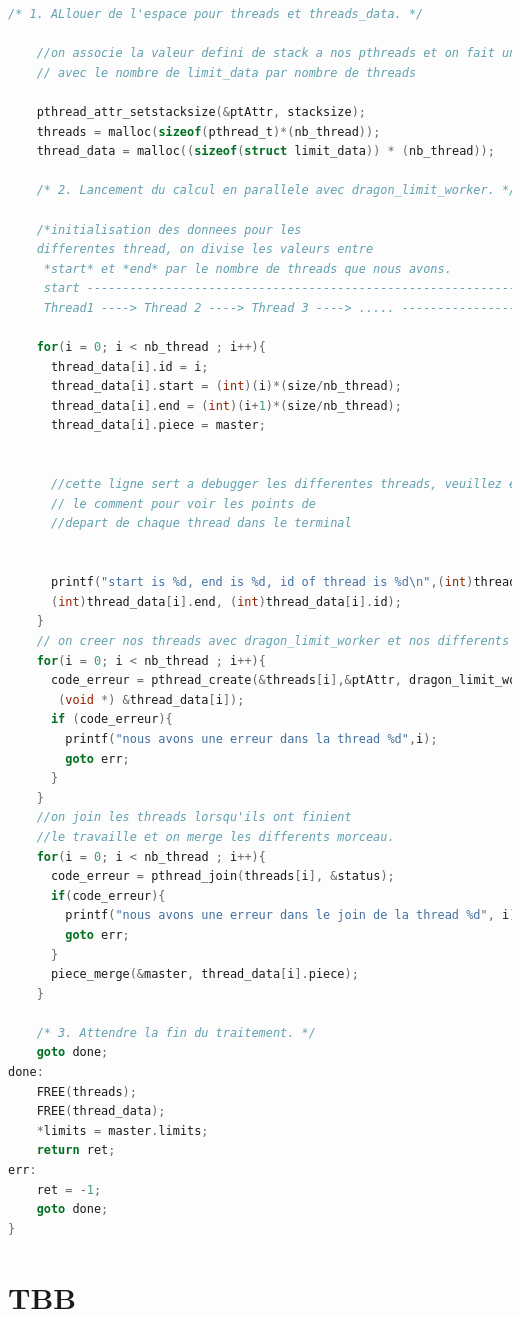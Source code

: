 \documentclass[oneside]{book}
\begin{document}
\begin{lstlisting}[language=C]
	/* 1. ALlouer de l'espace pour threads et threads_data. */
	
	//on associe la valeur defini de stack a nos pthreads et on fait un malloc
	// avec le nombre de limit_data par nombre de threads
	
	pthread_attr_setstacksize(&ptAttr, stacksize);
	threads = malloc(sizeof(pthread_t)*(nb_thread));
	thread_data = malloc((sizeof(struct limit_data)) * (nb_thread));
	
	/* 2. Lancement du calcul en parallele avec dragon_limit_worker. */
	
	/*initialisation des donnees pour les 
	differentes thread, on divise les valeurs entre 
	 *start* et *end* par le nombre de threads que nous avons. 
	 start --------------------------------------------------------------------> end
	 Thread1 ----> Thread 2 ----> Thread 3 ----> ..... ------------------------> end*/
	
	for(i = 0; i < nb_thread ; i++){
	  thread_data[i].id = i;
	  thread_data[i].start = (int)(i)*(size/nb_thread);
	  thread_data[i].end = (int)(i+1)*(size/nb_thread);
	  thread_data[i].piece = master;


	  //cette ligne sert a debugger les differentes threads, veuillez enlever
	  // le comment pour voir les points de
	  //depart de chaque thread dans le terminal
	  
	  
	  printf("start is %d, end is %d, id of thread is %d\n",(int)thread_data[i].start, 
	  (int)thread_data[i].end, (int)thread_data[i].id);
	}
	// on creer nos threads avec dragon_limit_worker et nos differents points de depart
	for(i = 0; i < nb_thread ; i++){
	  code_erreur = pthread_create(&threads[i],&ptAttr, dragon_limit_worker,
	   (void *) &thread_data[i]);
	  if (code_erreur){
		printf("nous avons une erreur dans la thread %d",i);
		goto err;
	  }
	}
	//on join les threads lorsqu'ils ont finient 
	//le travaille et on merge les differents morceau.
	for(i = 0; i < nb_thread ; i++){
	  code_erreur = pthread_join(threads[i], &status);
	  if(code_erreur){
		printf("nous avons une erreur dans le join de la thread %d", i);
		goto err;
	  }
	  piece_merge(&master, thread_data[i].piece);
	}
	
	/* 3. Attendre la fin du traitement. */
	goto done;
done:
	FREE(threads);
	FREE(thread_data);
	*limits = master.limits;
	return ret;
err:
	ret = -1;
	goto done;
}


\end{lstlisting}
\newpage

\section{TBB}
\end{document}
